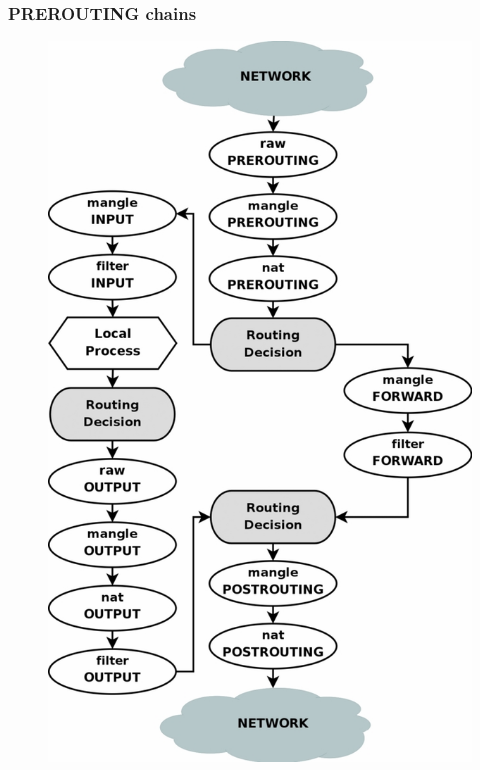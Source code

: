 \documentclass{beamer}
\begin{document}
\begin{frame}
\frametitle{PREROUTING chains}
\begin{figure}
\includegraphics[width=\textwidth]{tables_traverse}
\end{figure}
\end{frame}
\end{document}
